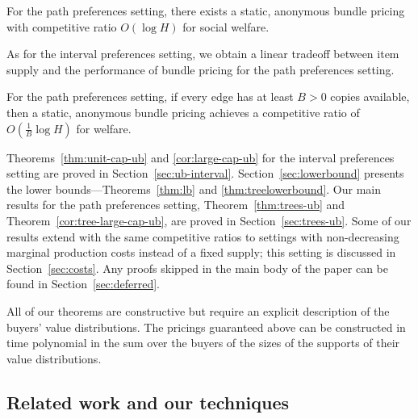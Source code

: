 \begin{theorem}
\label{thm:trees-ub}
For the path preferences setting, there exists a static, anonymous bundle
pricing with competitive ratio $O\left(\log H\right)$ for social welfare.
\end{theorem}


As for the interval preferences setting, we obtain a linear tradeoff
between item supply and the performance of bundle pricing for the path
preferences setting.
\begin{theorem}
\label{cor:tree-large-cap-ub}
For the path preferences setting, if every edge has at least $B>0$
copies available, then a static, anonymous bundle pricing achieves a
competitive ratio of
\(
    O\left(\frac1B\log H\right)
\)
for welfare.
\end{theorem}
Theorems~\ref{thm:unit-cap-ub} and \ref{cor:large-cap-ub} for the
interval preferences setting are proved in
Section~\ref{sec:ub-interval}. Section~\ref{sec:lowerbound} presents
the lower bounds---Theorems~\ref{thm:lb} and
\ref{thm:treelowerbound}. Our main results for the path preferences
setting, Theorem~\ref{thm:trees-ub} and Theorem~\ref{cor:tree-large-cap-ub}, are proved in
Section~\ref{sec:trees-ub}. Some of our results extend with the same
competitive ratios to settings with non-decreasing marginal production
costs instead of a fixed supply; this setting is discussed in{}
Section~\ref{sec:costs}. Any proofs skipped in the main body of the
paper can be found in Section~\ref{sec:deferred}.

All of our theorems are constructive but require an explicit
description of the buyers' value distributions. The pricings
guaranteed above can be constructed in time polynomial in the sum over
the buyers of the sizes of the supports of their value distributions.

\subsection{Related work and our techniques}

